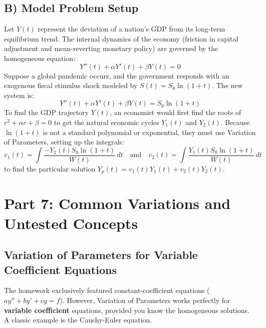 \documentclass{article}
\begin{document}
\subsection{B) Model Problem Setup}
Let $Y(t)$ represent the deviation of a nation's GDP from its long-term equilibrium trend. The internal dynamics of the economy (friction in capital adjustment and mean-reverting monetary policy) are governed by the homogeneous equation:
\[ Y''(t) + \alpha Y'(t) + \beta Y(t) = 0 \]
Suppose a global pandemic occurs, and the government responds with an exogenous fiscal stimulus shock modeled by $S(t) = S_0 \ln(1+t)$. The new system is:
\[ Y''(t) + \alpha Y'(t) + \beta Y(t) = S_0 \ln(1+t) \]
To find the GDP trajectory $Y(t)$, an economist would first find the roots of $r^2 + \alpha r + \beta = 0$ to get the natural economic cycles $Y_1(t)$ and $Y_2(t)$. Because $\ln(1+t)$ is not a standard polynomial or exponential, they must use Variation of Parameters, setting up the integrals:
\[ v_1(t) = \int \frac{-Y_2(t) S_0 \ln(1+t)}{W(t)} \, dt \quad \text{and} \quad v_2(t) = \int \frac{Y_1(t) S_0 \ln(1+t)}{W(t)} \, dt \]
to find the particular solution $Y_p(t) = v_1(t)Y_1(t) + v_2(t)Y_2(t)$.

\section{Part 7: Common Variations and Untested Concepts}

\subsection{Variation of Parameters for Variable Coefficient Equations}
The homework exclusively featured constant-coefficient equations ($ay''+by'+cy=f$). However, Variation of Parameters works perfectly for \textbf{variable coefficient} equations, provided you know the homogeneous solutions. A classic example is the Cauchy-Euler equation.
\end{document}
